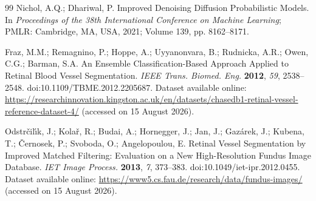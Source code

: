 \documentclass[jimaging,article,submit,pdftex,moreauthors]
  {Definitions/mdpi}
\newif\ifmdpiclass\mdpiclasstrue
\newif\ifmdpiclass\mdpiclassfalse
\providecommand{\href}[2]{#2}
\begin{document}
\begin{thebibliography}{99}
Nichol, A.Q.; Dhariwal, P. Improved Denoising Diffusion Probabilistic Models. In \textit{Proceedings of the 38th International Conference on Machine Learning}; PMLR: Cambridge, MA, USA, 2021; Volume 139, pp. 8162--8171.

Fraz, M.M.; Remagnino, P.; Hoppe, A.; Uyyanonvara, B.; Rudnicka, A.R.; Owen, C.G.; Barman, S.A. An Ensemble Classification-Based Approach Applied to Retinal Blood Vessel Segmentation. \textit{IEEE Trans. Biomed. Eng.} \textbf{2012}, \textit{59}, 2538--2548. \href{https://doi.org/10.1109/TBME.2012.2205687}{doi:10.1109/TBME.2012.2205687}. Dataset available online: \url{https://researchinnovation.kingston.ac.uk/en/datasets/chasedb1-retinal-vessel-reference-dataset-4/} (accessed on 15 August 2026).

Odstr\v{c}il\'{\i}k, J.; Kola\v{r}, R.; Budai, A.; Hornegger, J.; Jan, J.; Gaz\'arek, J.; Kubena, T.; \v{C}ernosek, P.; Svoboda, O.; Angelopoulou, E. Retinal Vessel Segmentation by Improved Matched Filtering: Evaluation on a New High-Resolution Fundus Image Database. \textit{IET Image Process.} \textbf{2013}, \textit{7}, 373--383. \href{https://doi.org/10.1049/iet-ipr.2012.0455}{doi:10.1049/iet-ipr.2012.0455}. Dataset available online: \url{https://www5.cs.fau.de/research/data/fundus-images/} (accessed on 15 August 2026).
\end{thebibliography}

\ifmdpiclass\PublishersNote{}\fi

\end{document}
